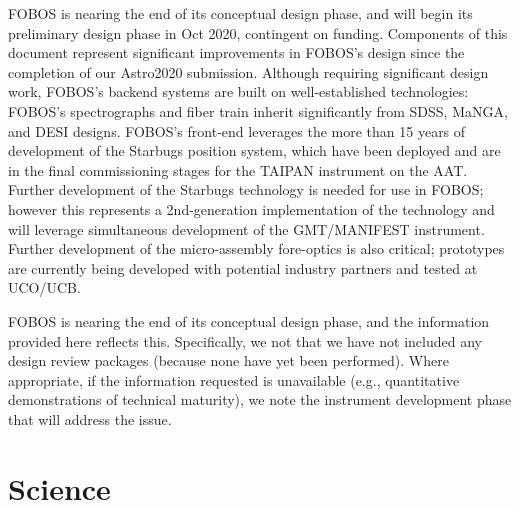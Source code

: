 \documentclass[oneside,11pt]{amsart}
\begin{document}
\smallskip


 FOBOS is nearing the end of
its conceptual design phase, and will begin its preliminary design
phase in Oct 2020, contingent on funding. Components of this document
represent significant improvements in FOBOS's design since the
completion of our Astro2020 submission. Although requiring
significant design work, FOBOS's backend systems are built on
well-established technologies: FOBOS's spectrographs and fiber train
inherit significantly from SDSS, MaNGA, and DESI designs. FOBOS's
front-end leverages the more than 15 years of development of the
Starbugs position system, which have been deployed and are in the
final commissioning stages for the TAIPAN instrument on the AAT.
Further development of the Starbugs technology is needed for use in
FOBOS; however this represents a 2nd-generation implementation of the
technology and will leverage simultaneous development of the
GMT/MANIFEST instrument. Further development of the micro-assembly
fore-optics is also critical; prototypes are currently being
developed with potential industry partners and tested at UCO/UCB.

\smallskip


 FOBOS is nearing the end of
its conceptual design phase, and the information provided here
reflects this. Specifically, we not that we have not included any
design review packages (because none have yet been performed). Where
appropriate, if the information requested is unavailable (e.g.,
quantitative demonstrations of technical maturity), we note the
instrument development phase that will address the issue.

\newpage

\section{Science}

\end{document}
